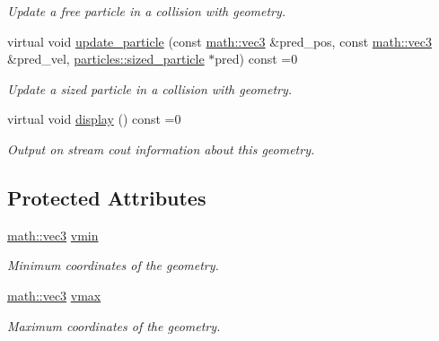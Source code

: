 \begin{DoxyCompactItemize}
\begin{DoxyCompactList}\small\item\em Update a free particle in a collision with geometry. \end{DoxyCompactList}\item 
virtual void \hyperlink{classphysim_1_1geometry_1_1geometry_afb3aefeefc98c6d310d7dd93a9d4ff9c}{update\+\_\+particle} (const \hyperlink{structphysim_1_1math_1_1vec3}{math\+::vec3} \&pred\+\_\+pos, const \hyperlink{structphysim_1_1math_1_1vec3}{math\+::vec3} \&pred\+\_\+vel, \hyperlink{classphysim_1_1particles_1_1sized__particle}{particles\+::sized\+\_\+particle} $\ast$pred) const =0
\begin{DoxyCompactList}\small\item\em Update a sized particle in a collision with geometry. \end{DoxyCompactList}\item 
\mbox{\label{classphysim_1_1geometry_1_1geometry_a4f0a158fd16a6a22dee4b428fa07f906}} 
virtual void \hyperlink{classphysim_1_1geometry_1_1geometry_a4f0a158fd16a6a22dee4b428fa07f906}{display} () const =0
\begin{DoxyCompactList}\small\item\em Output on stream {\itshape cout} information about this geometry. \end{DoxyCompactList}\end{DoxyCompactItemize}
\subsection*{Protected Attributes}
\begin{DoxyCompactItemize}
\item 
\mbox{\label{classphysim_1_1geometry_1_1geometry_aa71bc00f1ee7985bea5a62c090e3e83f}} 
\hyperlink{structphysim_1_1math_1_1vec3}{math\+::vec3} \hyperlink{classphysim_1_1geometry_1_1geometry_aa71bc00f1ee7985bea5a62c090e3e83f}{vmin}
\begin{DoxyCompactList}\small\item\em Minimum coordinates of the geometry. \end{DoxyCompactList}\item 
\mbox{\label{classphysim_1_1geometry_1_1geometry_add95a288aa59f7fb24f6d9d69f397645}} 
\hyperlink{structphysim_1_1math_1_1vec3}{math\+::vec3} \hyperlink{classphysim_1_1geometry_1_1geometry_add95a288aa59f7fb24f6d9d69f397645}{vmax}
\begin{DoxyCompactList}\small\item\em Maximum coordinates of the geometry. \end{DoxyCompactList}\end{DoxyCompactItemize}


